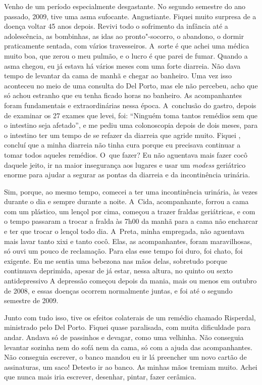 Venho de um período especialmente desgastante. No segundo semestre do
ano passado, 2009, tive uma asma sufocante. Angustiante. Fiquei muito
surpresa de a doença voltar 45 anos depois. Revivi todo o sofrimento da
infância até a adolescência, as bombinhas, as idas ao pronto"-socorro, o
abandono, o dormir praticamente sentada, com vários travesseiros. A~sorte é que achei uma médica muito boa, que zerou o meu pulmão, e o
lucro é que parei de fumar. Quando a asma chegou, eu já estava há vários
meses com uma forte diarreia. Não dava tempo de levantar da cama de
manhã e chegar ao banheiro. Uma vez isso aconteceu no meio de uma
consulta do Del Porto, mas ele não percebeu, acho que só achou estranho
que eu tenha ficado horas no banheiro. As acompanhantes foram
fundamentais e extraordinárias nessa época. A~conclusão do gastro,
depois de examinar os 27 exames que levei, foi: ``Ninguém toma tantos
remédios sem que o intestino seja afetado'', e me pediu uma colonoscopia
depois de dois meses, para o intestino ter um tempo de se refazer da
diarreia que agride muito. Fiquei , concluí que a minha diarreia
não tinha cura porque eu precisava continuar a tomar todos aqueles
remédios. O~que fazer? Eu não aguentava mais fazer cocô daquele jeito,
ir na maior insegurança aos lugares e usar um \emph{modess} geriátrico
enorme para ajudar a segurar as pontas da diarreia e da incontinência
urinária.

Sim, porque, ao mesmo tempo, comecei a ter uma incontinência urinária,
às vezes durante o dia e sempre durante a noite. A~Cida, acompanhante,
forrou a cama com um plástico, um lençol por cima, começou a trazer
fraldas geriátricas, e com o tempo passaram a trocar a fralda às 7h00 da
manhã para a cama não encharcar e ter que trocar o lençol todo dia. A~Preta, minha empregada, não aguentava mais lavar tanto xixi e tanto
cocô. Elas, as acompanhantes, foram maravilhosas, só ouvi um pouco de
reclamação. Para elas esse tempo foi duro, foi chato, foi exigente. Eu
me sentia uma bebezona nas mãos delas, sobretudo porque continuava
deprimida, apesar de já estar, nessa altura, no quinto ou sexto
antidepressivo A depressão começou depois da mania, mais ou menos em
outubro de 2008, e essas doenças ocorrem normalmente juntas, e foi até o
segundo semestre de 2009.

Junto com tudo isso, tive os efeitos colaterais de um remédio chamado
Risperdal, ministrado pelo Del Porto. Fiquei quase paralisada, com muita
dificuldade para andar. Andava só de passinhos e devagar, como uma
velhinha. Não conseguia levantar sozinha nem do sofá nem da cama, só com
a ajuda das acompanhantes. Não conseguia escrever, o banco mandou eu ir
lá preencher um novo cartão de assinaturas, um saco! Detesto ir ao
banco. As minhas mãos tremiam muito. Achei que nunca mais iria escrever,
desenhar, pintar, fazer cerâmica.

